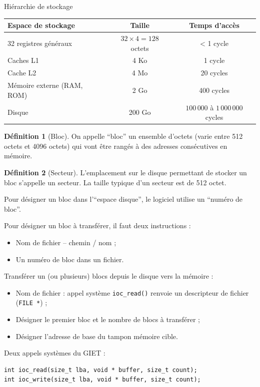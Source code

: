 \documentclass[11pt,english,french]{scrreprt}
\theoremstyle{remark}
\theoremstyle{definition}
\newtheorem*{def*}{Définition}
\begin{document}
Hiérarchie de stockage

\begin{tabularx}{\linewidth}{Xcc}
\toprule 
Espace de stockage & Taille & Temps d'accès\tabularnewline
\midrule
\midrule 
32 registres généraux & $32\times4=128$ octets & < 1 cycle\tabularnewline
\midrule 
Caches L1 & 4 Ko & 1 cycle\tabularnewline
\midrule 
Cache L2 & 4 Mo & 20 cycles\tabularnewline
\midrule 
Mémoire externe (RAM, ROM) & 2 Go & 400 cycles\tabularnewline
\midrule 
Disque & 200 Go & $100\,000$ à $1\,000\,000$ cycles\tabularnewline
\bottomrule
\end{tabularx}

\begin{def*}[Bloc]
	On appelle ``bloc'' un ensemble d'octets (varie entre 512 octets et 4096 octets) qui vont être rangés à des adresses consécutives en mémoire.
\end{def*}

\begin{def*}[Secteur]
	L'emplacement sur le disque permettant de stocker un bloc s'appelle un secteur. La taille typique d'un secteur est de 512 octet.
\end{def*}

Pour désigner un bloc dans l'``espace disque'', le logiciel utilise un ``numéro de bloc''.

Pour désigner un bloc à transférer, il faut deux instructions :\begin{itemize}
	\item Nom de fichier -- chemin / nom ;
	\item Un numéro de bloc dans un fichier.
\end{itemize}

\vspace{7pt}

Transférer un (ou plusieurs) blocs depuis le disque vers la mémoire :\begin{itemize}
	\item Nom de fichier : appel système \lstinline!ioc_read()! renvoie un descripteur de fichier (\lstinline!FILE *!) ;
	\item Désigner le premier bloc et le nombre de blocs à transférer ;
	\item Désigner l'adresse de base du tampon mémoire cible.
\end{itemize}

\vspace{7pt}

Deux appels systèmes du GIET :
\vspace{-5pt}\begin{lstlisting}
int ioc_read(size_t lba, void * buffer, size_t count);
int ioc_write(size_t lba, void * buffer, size_t count);
\end{lstlisting}
\end{document}

